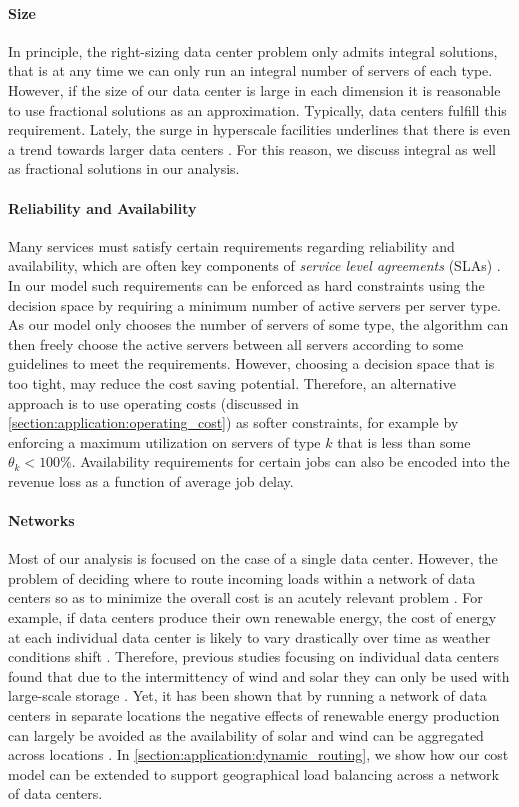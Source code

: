 \paragraph{Size} In principle, the right-sizing data center problem only admits integral solutions, that is at any time we can only run an integral number of servers of each type. However, if the size of our data center is large in each dimension it is reasonable to use fractional solutions as an approximation. Typically, data centers fulfill this requirement. Lately, the surge in hyperscale facilities underlines that there is even a trend towards larger data centers \cite{Jones2018}. For this reason, we discuss integral as well as fractional solutions in our analysis.

\paragraph{Reliability and Availability} Many services must satisfy certain requirements regarding reliability and availability, which are often key components of \textit{service level agreements} (SLAs) \cite{Lin2011}. In our model such requirements can be enforced as hard constraints using the decision space by requiring a minimum number of active servers per server type. As our model only chooses the number of servers of some type, the algorithm can then freely choose the active servers between all servers according to some guidelines to meet the requirements. However, choosing a decision space that is too tight, may reduce the cost saving potential. Therefore, an alternative approach is to use operating costs (discussed in \autoref{section:application:operating_cost}) as softer constraints, for example by enforcing a maximum utilization on servers of type $k$ that is less than some $\theta_k < 100\%$. Availability requirements for certain jobs can also be encoded into the revenue loss as a function of average job delay.

\paragraph{Networks} Most of our analysis is focused on the case of a single data center. However, the problem of deciding where to route incoming loads within a network of data centers so as to minimize the overall cost is an acutely relevant problem \cite{Miller2021}. For example, if data centers produce their own renewable energy, the cost of energy at each individual data center is likely to vary drastically over time as weather conditions shift \cite{Lin2012}. Therefore, previous studies focusing on individual data centers found that due to the intermittency of wind and solar they can only be used with large-scale storage \cite{Gmach2010, Gmach2010_2}. Yet, it has been shown that by running a network of data centers in separate locations the negative effects of renewable energy production can largely be avoided as the availability of solar and wind can be aggregated across locations \cite{Lin2012}. In \autoref{section:application:dynamic_routing}, we show how our cost model can be extended to support geographical load balancing across a network of data centers.

